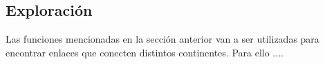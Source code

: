  \subsection{Exploraci\'on}
 
Las funciones mencionadas en la secci\'on anterior van a ser utilizadas para encontrar enlaces que conecten distintos continentes. Para ello ....